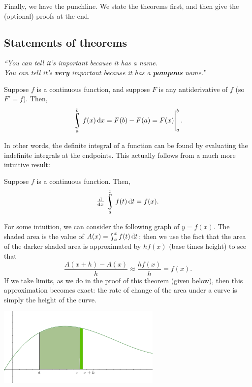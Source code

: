 


Finally, we have the punchline. We state the theorems first, and then give the (optional) proofs at the end.

\subsection*{Statements of theorems}
\begin{center}\itshape
  ``You can tell it's important because it has a name.\\You can tell it's \textbf{very} important because it has a \textbf{pompous} name.''
\end{center}

\begin{bthm}
  Suppose $ f $ is a continuous function, and suppose $ F $ is any antiderivative of $ f $ (so $ F' = f $). Then,
  \begin{displaymath}
    \rint^b_a f(x) \dif{x} = F(b) - F(a) = \eval{F(x)}_a^b.
  \end{displaymath}
\end{bthm}

In other words, the definite integral of a function can be found by evaluating the indefinite integrals at
the endpoints. This actually follows from a much more intuitive result:

\begin{bthm}
  Suppose $ f $ is a continuous function. Then,
  \begin{displaymath}
    \od{}{x} \rint^x_a f(t) \dif{t} = f(x).
  \end{displaymath}
\end{bthm}

For some intuition, we can consider the following graph of $ y = f(x) $. The shaded area is the value of $ A(x) = \rint^x_a f(t) \dif{t} $;
then we use the fact that the area of the darker shaded area is approximated by $ h f(x) $ (base times height) to see that
\begin{displaymath}
  \frac{A(x + h) - A(x)}{h} \approx \frac{h f(x)}{h} = f(x).
\end{displaymath}
If we take limits, as we do in the proof of this theorem (given below), then this approximation becomes exact: the rate of change of
the area under a curve is simply the height of the curve.

\begin{center}
  \includegraphics[width=0.6\textwidth]{ftc1}
\end{center}


